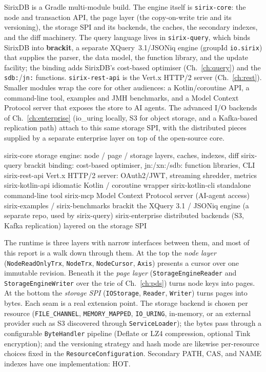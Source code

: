 \documentclass[11pt,a4paper,oneside]{report}
\newcommand{\dcap}[1]{\par\vspace{1pt}\noindent{\small\sffamily\bfseries\color{slate}#1}\par\vspace{-2pt}}
\theoremstyle{sirixthm}
\newcommand{\code}[1]{\texttt{#1}}
\begin{document}
SirixDB is a Gradle multi-module build. The engine itself is \code{sirix-core}: the node and
transaction API, the page layer (the copy-on-write trie and its versioning), the storage SPI and its
backends, the caches, the secondary indexes, and the diff machinery. The query language lives in
\code{sirix-query}, which binds SirixDB into \textbf{brackit}, a separate XQuery~3.1/JSONiq engine
(groupId \code{io.sirix}) that supplies the parser, the data model, the function library, and the update
facility; the binding adds SirixDB's cost-based optimiser (Ch.~\ref{ch:query}) and the
\code{sdb:}/\allowbreak\code{jn:} functions. \code{sirix-rest-api} is the Vert.x HTTP/2 server
(Ch.~\ref{ch:rest}). Smaller modules wrap the core for other audiences: a Kotlin/coroutine API, a
command-line tool, examples and JMH benchmarks, and a Model Context Protocol server that exposes the
store to AI agents. The advanced I/O backends of Ch.~\ref{ch:enterprise} (io\_uring locally, S3 for
object storage, and a Kafka-based replication path) attach to this same storage SPI, with the
distributed pieces supplied by a separate enterprise layer on top of the open-source core.

\dcap{The open-source modules and the brackit engine}
\begin{diagramS}
sirix-core         storage engine: node / page / storage layers, caches, indexes, diff
sirix-query        brackit binding: cost-based optimiser, jn:/xn:/sdb: function libraries, CLI
sirix-rest-api     Vert.x HTTP/2 server: OAuth2/JWT, streaming shredder, metrics
sirix-kotlin-api   idiomatic Kotlin / coroutine wrapper
sirix-kotlin-cli   standalone command-line tool
sirix-mcp          Model Context Protocol server (AI-agent access)
sirix-examples / sirix-benchmarks
brackit            the XQuery 3.1 / JSONiq engine (a separate repo, used by sirix-query)
sirix-enterprise   distributed backends (S3, Kafka replication) layered on the storage SPI
\end{diagramS}

The runtime is three layers with narrow interfaces between them, and most of this report is a walk down
through them. At the top the \emph{node layer} (\code{NodeReadOnlyTrx}, \code{NodeTrx},
\code{NodeCursor}, \code{Axis}) presents a cursor over one immutable revision. Beneath it the \emph{page
layer} (\code{StorageEngineReader} and \code{StorageEngineWriter} over the trie of Ch.~\ref{ch:pds})
turns node keys into pages. At the bottom the \emph{storage SPI} (\code{IOStorage}, \code{Reader},
\code{Writer}) turns pages into bytes. Each seam is a real extension point. The storage backend is
chosen per resource (\code{FILE\_CHANNEL}, \code{MEMORY\_MAPPED}, \code{IO\_URING}, in-memory, or an
external provider such as S3 discovered through \code{ServiceLoader}); the bytes pass through a
configurable \code{ByteHandler} pipeline (Deflate or LZ4 compression, optional Tink encryption); and the
versioning strategy and hash mode are likewise per-resource choices fixed in the
\code{ResourceConfiguration}. Secondary PATH, CAS, and NAME indexes have one implementation: HOT.
\end{document}
